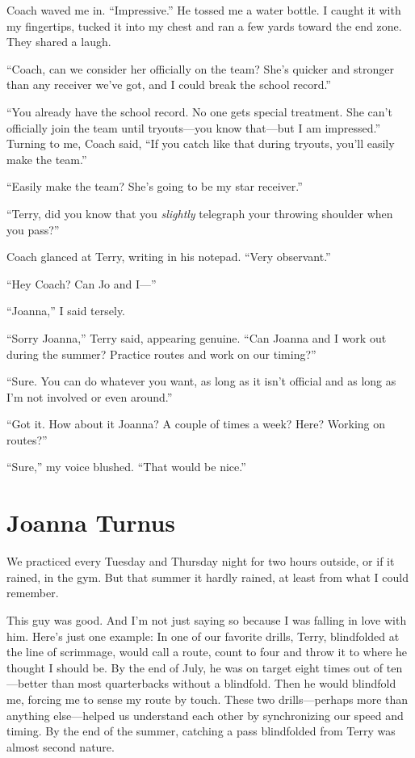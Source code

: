 Coach waved me in. ``Impressive.'' He tossed me a water bottle. I caught
it with my fingertips, tucked it into my chest and ran a few yards
toward the end zone. They shared a laugh.

``Coach, can we consider her officially on the team? She's quicker and
stronger than any receiver we've got, and I could break the school
record.''

``You already have the school record. No one gets special treatment. She
can't officially join the team until tryouts---you know that---but I am
impressed.'' Turning to me, Coach said, ``If you catch like that during
tryouts, you'll easily make the team.''

``Easily make the team? She's going to be my star receiver.''

``Terry, did you know that you \emph{slightly} telegraph your throwing
shoulder when you pass?''

Coach glanced at Terry, writing in his notepad. ``Very observant.''

``Hey Coach? Can Jo and I---''

``Joanna,'' I said tersely.

``Sorry Joanna,'' Terry said, appearing genuine. ``Can Joanna and I work
out during the summer? Practice routes and work on our timing?''

``Sure. You can do whatever you want, as long as it isn't official and
as long as I'm not involved or even around.''

``Got it. How about it Joanna? A couple of times a week? Here? Working
on routes?''

``Sure,'' my voice blushed. ``That would be nice.''

\chapter{Joanna Turnus}

\titlemark

We practiced every Tuesday and Thursday night for two hours outside, or
if it rained, in the gym. But that summer it hardly rained, at least
from what I could remember.

This guy was good. And I'm not just saying so because I was falling in
love with him. Here's just one example: In one of our favorite drills,
Terry, blindfolded at the line of scrimmage, would call a route, count
to four and throw it to where he thought I should be. By the end of
July, he was on target eight times out of ten---better than most
quarterbacks without a blindfold. Then he would blindfold me, forcing me
to sense my route by touch. These two drills---perhaps more than
anything else---helped us understand each other by synchronizing our
speed and timing. By the end of the summer, catching a pass blindfolded
from Terry was almost second nature.

